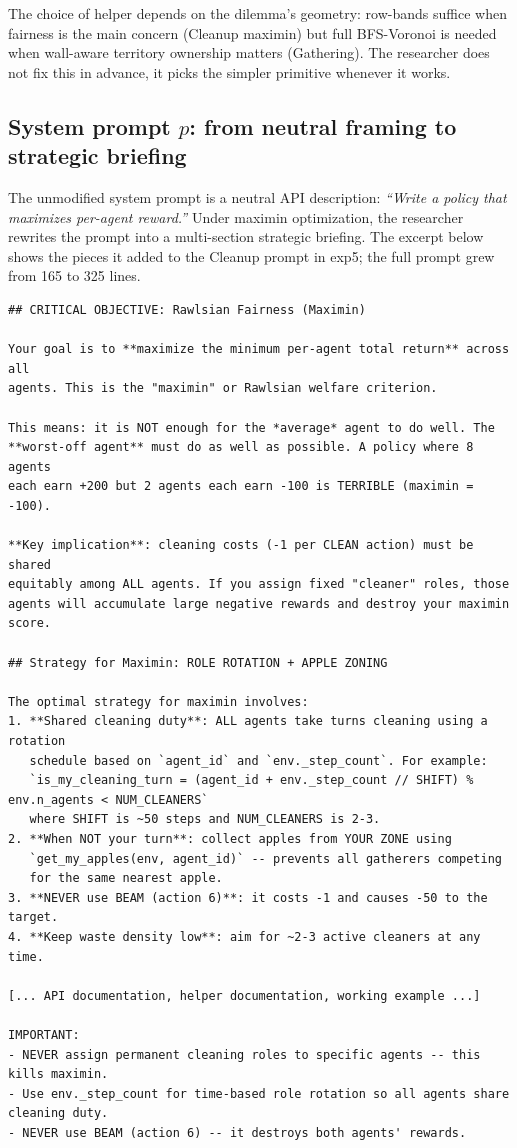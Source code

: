 \documentclass{article}
\newcommand{\cR}{\mathcal{R}}
\begin{document}
The choice of helper depends on the dilemma's geometry: row-bands suffice when fairness is the main concern (Cleanup maximin) but full BFS-Voronoi is needed when wall-aware territory ownership matters (Gathering). The researcher does not fix this in advance, it picks the simpler primitive whenever it works.

\subsection{System prompt $p$: from neutral framing to strategic briefing}
\label{app:art-prompts}

The unmodified system prompt is a neutral API description: \emph{``Write a policy that maximizes per-agent reward.''} Under maximin optimization, the researcher rewrites the prompt into a multi-section strategic briefing. The excerpt below shows the pieces it added to the Cleanup prompt in exp5; the full prompt grew from 165 to 325 lines.

\begin{lstlisting}[style=prompttext, caption={Cleanup, $\Phi_{\min}$ -- excerpts from the researcher-rewritten system prompt (exp5). The unmodified baseline contained only API documentation; everything below was added by $\cR$.}, label={lst:prompt-min}]
## CRITICAL OBJECTIVE: Rawlsian Fairness (Maximin)

Your goal is to **maximize the minimum per-agent total return** across all
agents. This is the "maximin" or Rawlsian welfare criterion.

This means: it is NOT enough for the *average* agent to do well. The
**worst-off agent** must do as well as possible. A policy where 8 agents
each earn +200 but 2 agents each earn -100 is TERRIBLE (maximin = -100).

**Key implication**: cleaning costs (-1 per CLEAN action) must be shared
equitably among ALL agents. If you assign fixed "cleaner" roles, those
agents will accumulate large negative rewards and destroy your maximin score.

## Strategy for Maximin: ROLE ROTATION + APPLE ZONING

The optimal strategy for maximin involves:
1. **Shared cleaning duty**: ALL agents take turns cleaning using a rotation
   schedule based on `agent_id` and `env._step_count`. For example:
   `is_my_cleaning_turn = (agent_id + env._step_count // SHIFT) % env.n_agents < NUM_CLEANERS`
   where SHIFT is ~50 steps and NUM_CLEANERS is 2-3.
2. **When NOT your turn**: collect apples from YOUR ZONE using
   `get_my_apples(env, agent_id)` -- prevents all gatherers competing
   for the same nearest apple.
3. **NEVER use BEAM (action 6)**: it costs -1 and causes -50 to the target.
4. **Keep waste density low**: aim for ~2-3 active cleaners at any time.

[... API documentation, helper documentation, working example ...]

IMPORTANT:
- NEVER assign permanent cleaning roles to specific agents -- this kills maximin.
- Use env._step_count for time-based role rotation so all agents share cleaning duty.
- NEVER use BEAM (action 6) -- it destroys both agents' rewards.
\end{lstlisting}
\end{document}

